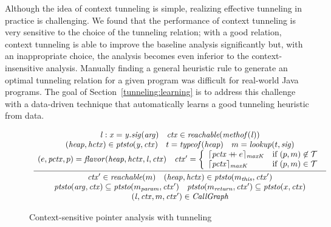 Although the idea of context tunneling is simple, realizing effective
tunneling in practice is challenging. We found that the performance of
context tunneling is very sensitive to the choice of the tunneling
relation; with a good relation, context tunneling is able to improve the
baseline analysis significantly but, with an inappropriate choice, the analysis
becomes even inferior to the context-insensitive analysis.  Manually finding a general heuristic rule to
generate an optimal tunneling relation for a given program was
difficult for real-world Java programs.
The goal of Section~\ref{tunneling:learning} is to address this challenge
with a data-driven technique that automatically learns a good
tunneling heuristic from data.

\begin{figure}[t]
  \[
    \begin{array}{c}
      \infer[]
      {
      \begin{array}{c}
        \ctx' \in \Reachable ({m}) \quad
        ({\heap}, {\hctx}) \in  \VarPointsTo ({m_{\this}}, {\ctx'}) \\
        \VarPointsTo({\it arg}, \ctx) \subseteq \VarPointsTo(m_{\it param}, \ctx')
        \quad
        \VarPointsTo(m_{\it return}, \ctx') \subseteq \VarPointsTo(x, \ctx)\\
        (\invo, \ctx, m, \ctx') \in \CallGraph
      \end{array}
      }{
      \begin{array}{c}
        {\it \invo : x = y.\sig({\it arg})} \quad
        \ctx \in    \Reachable ({\methof(\invo)}) \\
        ({\heap}, {\hctx})\in  \VarPointsTo ({\it y},\ctx) \quad
        t = {\typeof}(\heap)  \quad m = {\lookup}(t, \sig) \\
(e, {\pctx}, p) = \parent(\heap,\hctx, \invo, \ctx) \quad
        \ctx' = \left\{
        \begin{array}{l@{\quad}l}
          \truncateCtx{\appendCtx{{ \pctx}}{{e}}}{\CallDepth}
          & \mbox{if}~(p,m)\not\in \TunnelingRelation \\
          \truncateCtx{\pctx}{\CallDepth}     & \mbox{if}~(p,m)
                                                \in \TunnelingRelation
        \end{array}
                                                          \right.
      \end{array}
                                                          }
    \end{array}
  \]
  \caption{Context-sensitive pointer analysis with tunneling}
\label{fig:tunneling-rules}
\end{figure}


